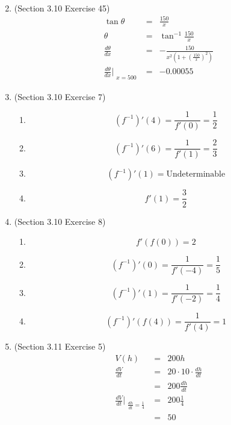 \documentclass{article}
\begin{document}
\begin{enumerate}
\begin{eqnarray}
        \end{eqnarray}
    \item (Section 3.10 Exercise 45)
        \begin{eqnarray}
            \tan{\theta} &=& \frac{150}{x} \\
            \theta &=& \tan^{-1}{\frac{150}{x}} \\
            \frac{d\theta}{dx} &=& -\frac{150}{x^2\left(1 + \left(\frac{150}{x}\right)^2\right)} \\
            \frac{d\theta}{dx}\Bigr|_{\substack{x = 500}} &=& -0.00055
        \end{eqnarray}
    \item (Section 3.10 Exercise 7)
        \begin{enumerate}
            \item $$\left(f^{-1}\right)'\left(4\right) = \frac{1}{f'(0)} = \frac{1}{2}$$
            \item $$\left(f^{-1}\right)'\left(6\right) = \frac{1}{f'(1)} = \frac{2}{3}$$
            \item $$\left(f^{-1}\right)'\left(1\right) = \text{Undeterminable}$$
            \item $$f'\left(1\right) = \frac{3}{2}$$
        \end{enumerate}
    \item (Section 3.10 Exercise 8)
        \begin{enumerate}
            \item $$f'\left(f\left(0\right)\right) = 2$$
            \item $$\left(f^{-1}\right)'\left(0\right) = \frac{1}{f'(-4)} = \frac{1}{5}$$
            \item $$\left(f^{-1}\right)'\left(1\right) = \frac{1}{f'(-2)} = \frac{1}{4}$$
            \item $$\left(f^{-1}\right)'\left(f\left(4\right)\right) = \frac{1}{f'(4)} = 1$$
        \end{enumerate}
    \item (Section 3.11 Exercise 5)
        \begin{eqnarray}
            V(h) &=& 200h \\
            \frac{dV}{dt} &=& 20 \cdot 10 \cdot \frac{dh}{dt} \\
                          &=& 200\frac{dh}{dt} \\
            \frac{dV}{dt}\Bigr|_{\substack{\frac{dh}{dt} = \frac{1}{4}}} &=& 200\frac{1}{4} \\
                                                   &=& 50 \\

\end{eqnarray}
\end{enumerate}
\end{document}
